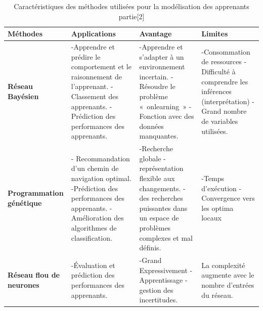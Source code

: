\begin{table}[!htbp]
	\begin{tabular}{|m{3cm}|m{4cm}|m{4cm}|m{4cm}|} %
	\hline
	\rowcolor{blueforest}
	\color{white} \textbf{Méthodes} & \color{white} \textbf{Applications} & \color{white} \textbf{Avantage} & \color{white} \textbf{Limites} \\
	\hline\hline
	  \textbf{Réseau Bayésien}  &
	  -Apprendre et prédire le comportement et le raisonnement de l'apprenant. \newline
	  -Classement des apprenants. \newline
	  -Prédiction des performances des apprenants.&
	  -Apprendre et s'adapter à un environnement incertain.\newline
	  -Résoudre le problème « onlearning » \newline
	  -Fonction avec des données manquantes.&
	  -Consommation de ressources \newline
	  -Difficulté à comprendre les inférences (interprétation) \newline
	  -Grand nombre de variables utilisées. \\ \hline
	  \textbf{Programmation génétique}  &
	  - Recommandation d'un chemin de navigation optimal. \newline
	  -Prédiction des performances des apprenants. \newline
	  -Amélioration des algorithmes de classification.&
	  -Recherche globale \newline
	  -représentation flexible aux changements. \newline
	  -des recherches puissantes dans un espace de problèmes complexes et mal définis.&
	  -Temps d'exécution \newline
	  -Convergence vers les optima locaux \\ \hline
	  \textbf{Réseau flou de neurones}  &
	  -Évaluation et prédiction des performances des apprenants.&
	  -Grand Expressivement \newline
	  -Apprentissage \newline
	  -gestion des incertitudes.&
	  La complexité augmente avec le nombre d'entrées du réseau. \\ \hline
	\end{tabular}
	\caption{Caractéristiques des méthodes utilisées pour la modélisation des apprenants partie[2]}
	\label{Caracteristiques_modelisation_apprenants2}
\end{table}

